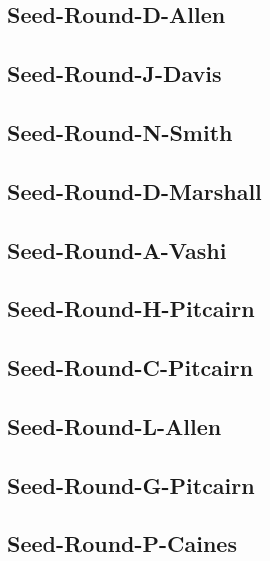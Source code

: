\documentclass[letterpaper,10pt,english]{sphinxmanual}
\begin{document}
\subsection{Seed-Round-D-Allen}
\label{\detokenize{statements:seed-round-d-allen}}

\subsection{Seed-Round-J-Davis}
\label{\detokenize{statements:seed-round-j-davis}}

\subsection{Seed-Round-N-Smith}
\label{\detokenize{statements:seed-round-n-smith}}

\subsection{Seed-Round-D-Marshall}
\label{\detokenize{statements:seed-round-d-marshall}}

\subsection{Seed-Round-A-Vashi}
\label{\detokenize{statements:seed-round-a-vashi}}

\subsection{Seed-Round-H-Pitcairn}
\label{\detokenize{statements:seed-round-h-pitcairn}}

\subsection{Seed-Round-C-Pitcairn}
\label{\detokenize{statements:seed-round-c-pitcairn}}

\subsection{Seed-Round-L-Allen}
\label{\detokenize{statements:seed-round-l-allen}}

\subsection{Seed-Round-G-Pitcairn}
\label{\detokenize{statements:seed-round-g-pitcairn}}

\subsection{Seed-Round-P-Caines}
\label{\detokenize{statements:seed-round-p-caines}}
\end{document}
